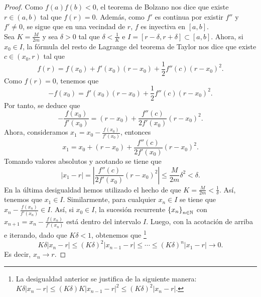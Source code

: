 \begin{proof}
	Como $\displaystyle f\left(a\right)f\left(b\right) < 0 $, el teorema de Bolzano nos dice que existe $\displaystyle r \in \left(a,b\right) $ tal que $\displaystyle f\left(r\right) = 0 $. Además, como $\displaystyle f' $ es continua por existir $\displaystyle f'' $ y $\displaystyle f' \neq 0 $, se sigue que en una vecindad de $\displaystyle r $, $\displaystyle f $ es inyectiva en $\displaystyle \left[a,b\right]  $. \\ 
	Sea $\displaystyle K = \frac{M}{2m} $ y sea $\displaystyle \delta > 0 $ tal que $\displaystyle \delta < \frac{1}{K} $ e $\displaystyle I = \left[r-\delta, r + \delta \right] \subset \left[a,b\right] $.
	Ahora, si $\displaystyle x_{0} \in I $, la fórmula del resto de Lagrange del teorema de Taylor nos dice que existe $\displaystyle c \in \left(x_{0}, r\right) $ tal que
	\[f\left(r\right) = f\left(x_{0}\right) + f'\left(x_{0}\right)\left(r-x_{0}\right) + \frac{1}{2}f''\left(c\right)\left(r-x_{0}\right)^{2} .\]
	Como $\displaystyle f\left(r\right) = 0 $, tenemos que
	\[ -f\left(x_{0}\right) = f'\left(x_{0}\right)\left(r-x_{0}\right)+\frac{1}{2}f''\left(c\right)\left(r-x_{0}\right)^{2} .\]
	Por tanto, se deduce que 
	\[-\frac{f\left(x_{0}\right)}{f'\left(x_{0}\right)} = \left(r-x_{0}\right) + \frac{f''\left(c\right)}{2f'\left(x_{0}\right)}\left(r-x_{0}\right)^{2} .\]
Ahora, consideramos $\displaystyle x_{1} = x_{0} - \frac{f\left(x_{0}\right)}{f'\left(x_{0}\right)} $, entonces 
\[x_{1} = x_{0} + \left(r-x_{0}\right)+\frac{f''\left(c\right)}{2f'\left(x_{0}\right)}\left(r-x_{0}\right)^{2} .\]
Tomando valores absolutos y acotando se tiene que
\[ \left|x_{1}-r\right| = \left|\frac{f''\left(c\right)}{2f'\left(x_{0}\right)}\left(r-x_{0}\right)^{2}\right| \leq \frac{M}{2m}\delta ^{2} < \delta  .\]
En la última desigualdad hemos utilizado el hecho de que $\displaystyle K = \frac{M}{2m} < \frac{1}{\delta } $. Así, tenemos que $\displaystyle x_{1} \in I $. Similarmente, para cualquier $\displaystyle x_{n} \in I $ se tiene que $\displaystyle x_{n} -\frac{f\left(x_{n}\right)}{f'\left(x_{n}\right)} \in I $. Así, si $\displaystyle x_{0} \in I $, la sucesión recurrente $\displaystyle \left\{ x_{n}\right\} _{n\in\mathbb{N}} $ con $\displaystyle x_{n+1} = x_{n} -\frac{f\left(x_{n}\right)}{f'\left(x_{n}\right)} $ está dentro del intervalo $\displaystyle I $.
Luego, con la acotación de arriba e iterando, dado que $\displaystyle K\delta < 1 $, obtenemos que \footnote{La desigualdad anterior se justifica de la siguiente manera: $\displaystyle K\delta \left|x_{n}-r\right| \leq \left(K\delta \right)K \left|x_{n-1}-r\right|^{2} \leq \left(K\delta \right)^{2} \left|x_{n}-r\right| $. } 
\[ K\delta \left|x_{n}-r\right| \leq \left(K\delta \right)^{2} \left|x_{n-1}-r\right| \leq \cdots \leq \left(K\delta \right)^{n} \left|x_{1}-r\right| \to 0 .\]
Es decir, $\displaystyle x_{n} \to r $.
\end{proof}
